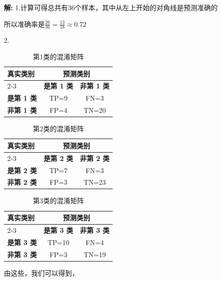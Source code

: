 \documentclass[8pt]{article}
\begin{document}
\textbf{\large 解:}
1.计算可得总共有36个样本，其中从左上开始的对角线是预测准确的

所以准确率是$\frac{26}{36}= \frac{13}{18}\approx 0.72$

2.
\begin{table}[H]
\centering
\begin{tabular}{lcc}
\toprule
\multirow{2}{*}{\textbf{真实类别}} & \multicolumn{2}{c}{\textbf{预测类别}} \\
\cmidrule(lr){2-3}
 & \textbf{是第 1 类} & \textbf{非第 1 类} \\
\midrule
\textbf{是第 1 类} & TP=9 & FN=3 \\
\textbf{非第 1 类} & FP=4 & TN=20 \\
\bottomrule
\end{tabular}
\caption{第1类的混淆矩阵}
\label{tab:confusion-class1}
\end{table}

\begin{table}[H]
\centering
\begin{tabular}{lcc}
\toprule
\multirow{2}{*}{\textbf{真实类别}} & \multicolumn{2}{c}{\textbf{预测类别}} \\
\cmidrule(lr){2-3}
 & \textbf{是第 2 类} & \textbf{非第 2 类} \\
\midrule
\textbf{是第 2 类} & TP=7 & FN=3 \\
\textbf{非第 2 类} & FP=3 & TN=23 \\
\bottomrule
\end{tabular}
\caption{第2类的混淆矩阵}
\label{tab:confusion-class2}
\end{table}

\begin{table}[H]
\centering
\begin{tabular}{lcc}
\toprule
\multirow{2}{*}{\textbf{真实类别}} & \multicolumn{2}{c}{\textbf{预测类别}} \\
\cmidrule(lr){2-3}
 & \textbf{是第 3 类} & \textbf{非第 3 类} \\
\midrule
\textbf{是第 3 类} & TP=10 & FN=4 \\
\textbf{非第 3 类} & FP=3 & TN=19 \\
\bottomrule
\end{tabular}
\caption{第3类的混淆矩阵}
\label{tab:confusion-class3}
\end{table}

由这些，我们可以得到，
\end{document}
